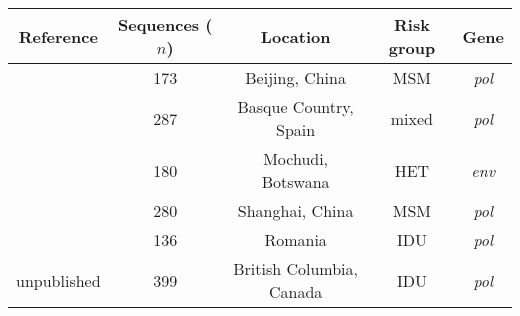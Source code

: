 \begin{tabular}{ccccc}
  Reference & Sequences ($n$) & Location & Risk group & Gene \\
  \hline
  \textcite{wang2015targeting} & 173 & Beijing, China & MSM & \textit{pol} \\
  \textcite{cuevas2009hiv} & 287 & Basque Country, Spain & mixed & \textit{pol} \\
  \textcite{novitsky2013phylogenetic} & \multirow{2}{*}{180} &
  \multirow{2}{*}{Mochudi, Botswana} & \multirow{2}{*}{HET} &
  \multirow{2}{*}{\textit{env}} \\ \textcite{novitsky2014impact} \\
  \textcite{li2015hiv} & 280 & Shanghai, China & MSM & \textit{pol} \\
  \textcite{niculescu2015recent} & 136 & Romania & IDU & \textit{pol} \\
  unpublished & 399 & British Columbia, Canada & IDU & \textit{pol} \\
  \hline
\end{tabular}
